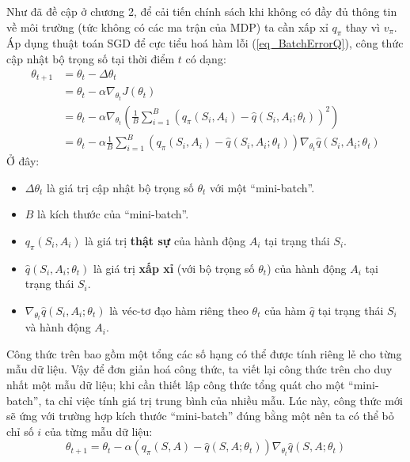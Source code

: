 	Như đã đề cập ở chương 2, để cải tiến chính sách khi không có đầy đủ thông tin về môi trường (tức không có các ma trận của MDP) ta cần xấp xỉ $q_{\pi}$ thay vì $v_{\pi}$. Áp dụng thuật toán SGD để cực tiểu hoá hàm lỗi (\ref{eq_BatchErrorQ}), công thức cập nhật bộ trọng số tại thời điểm $t$ có dạng:
	\begin{align}
		\theta_{t + 1} &= \theta_t - \Delta \theta_t \nonumber \\
		&= \theta_t - \alpha \nabla_{\theta_t} J(\theta_t) \nonumber \\
		&= \theta_t - \alpha \nabla_{\theta_t} \left( \frac{1}{B} \sum_{i = 1}^{B}(q_{\pi}(S_i,A_i) - \hat{q}(S_i,A_i;\theta_t))^2 \right) \nonumber\\
		\label{eq_SGDTrueQ_Update}
		&= \theta_t - \alpha \frac{1}{B} \sum_{i = 1}^{B}(q_{\pi}(S_i,A_i) - \hat{q}(S_i,A_i;\theta_t)) \nabla_{\theta_t} \hat{q}(S_i, A_i;\theta_t)
	\end{align}
	Ở đây:
	\begin{itemize}
		\item $\Delta \theta_t$ là giá trị cập nhật bộ trọng số $\theta_t$ với một ``mini-batch''.
		\item $B$ là kích thước của ``mini-batch''.
		\item $q_{\pi}(S_i,A_i)$ là giá trị \textbf{thật sự} của hành động $A_i$ tại trạng thái $S_i$.
		\item $\hat{q}(S_i,A_i;\theta_t)$ là giá trị \textbf{xấp xỉ} (với bộ trọng số $\theta_t$) của hành động $A_i$ tại trạng thái $S_i$.
		\item $\nabla_{\theta_t} \hat{q}(S_i, A_i;\theta_t)$ là véc-tơ đạo hàm riêng theo $\theta_t$ của hàm $\hat{q}$ tại trạng thái $S_i$ và hành động $A_i$.
	\end{itemize}
	Công thức trên bao gồm một tổng các số hạng có thể được tính riêng lẻ cho từng mẫu dữ liệu.
	Vậy để đơn giản hoá công thức, ta viết lại công thức trên cho duy nhất một mẫu dữ liệu; khi cần thiết lập công thức tổng quát cho một ``mini-batch'', ta chỉ việc tính giá trị trung bình của nhiều mẫu.
	Lúc này, công thức mới sẽ ứng với trường hợp kích thước ``mini-batch'' đúng bằng một nên ta có thể bỏ chỉ số $i$ của từng mẫu dữ liệu:
	\begin{equation}
		\label{eq_SGDTrueQ_Single_Update}
		\theta_{t+1} = \theta_t - \alpha (q_{\pi}(S,A) - \hat{q}(S,A;\theta_t)) \nabla_{\theta_t} \hat{q}(S, A;\theta_t)
	\end{equation}
	
